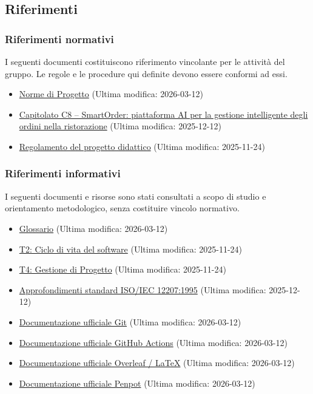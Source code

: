 \documentclass[a4paper, 11pt, oneside]{scrartcl}
\begin{document}
\subsection{Riferimenti}

\subsubsection{Riferimenti normativi}
I seguenti documenti costituiscono riferimento vincolante per le attività del gruppo.
Le regole e le procedure qui definite devono essere conformi ad essi.

\begin{itemize}
    \item \href{URL_NORME_DI_PROGETTO}{Norme di Progetto} (Ultima modifica: 2026-03-12)
    \item \href{URL_CAPITOLATO_C8}{Capitolato C8 – SmartOrder: piattaforma AI per la gestione intelligente degli ordini nella ristorazione} (Ultima modifica: 2025-12-12)
    \item \href{URL_REGOLAMENTO}{Regolamento del progetto didattico} (Ultima modifica: 2025-11-24)
\end{itemize}

\subsubsection{Riferimenti informativi}
I seguenti documenti e risorse sono stati consultati a scopo di studio e orientamento metodologico, senza costituire vincolo normativo.

\begin{itemize}
    \item \href{URL_GLOSSARIO}{Glossario} (Ultima modifica: 2026-03-12)
    \item \href{https://www.math.unipd.it/~tullio/IS-1/2025/Dispense/T2.pdf}{T2: Ciclo di vita del software} (Ultima modifica: 2025-11-24)
    \item \href{https://www.math.unipd.it/~tullio/IS-1/2025/Dispense/T4.pdf}{T4: Gestione di Progetto} (Ultima modifica: 2025-11-24)
    \item \href{https://www.math.unipd.it/~rcardin/swea/2021/Lezione-ArchiSW-1.pdf}{Approfondimenti standard ISO/IEC 12207:1995} (Ultima modifica: 2025-12-12)
    \item \href{https://git-scm.com/doc}{Documentazione ufficiale Git} (Ultima modifica: 2026-03-12)
    \item \href{https://docs.github.com/en/actions}{Documentazione ufficiale GitHub Actions} (Ultima modifica: 2026-03-12)
    \item \href{https://www.overleaf.com/learn}{Documentazione ufficiale Overleaf / \LaTeX{}} (Ultima modifica: 2026-03-12)
    \item \href{https://help.penpot.app}{Documentazione ufficiale Penpot} (Ultima modifica: 2026-03-12)
\end{itemize}
\end{document}
